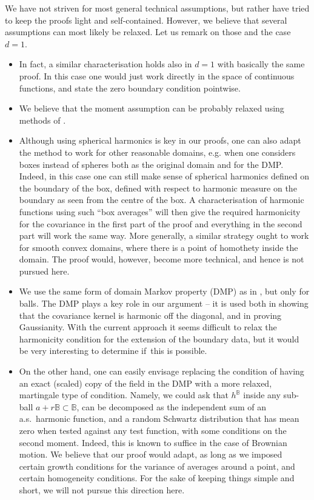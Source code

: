 \documentclass[JEP,XML,SOM,Unicode,published]{cedram}
\theoremstyle{definition}
\newcommand{\B}{\mathbb{B}}\let\D\B\let\Ub\B
\begin{document}
We have not striven for most general technical assumptions, but rather have tried to keep the proofs light and self-contained. However, we believe that several assumptions can most likely be relaxed. Let us remark on those and the case $d = 1$.\vspace*{-.3\baselineskip}\enlargethispage{\baselineskip}%

\begin{itemize}
\item In fact, a similar characterisation holds also in $d = 1$ with basically the same proof. In this case one would just work directly in the space of continuous functions, and state the zero boundary condition pointwise.
\item We believe that the moment assumption can be probably relaxed using methods of \cite{BPR20}.
\item Although using spherical harmonics is key in our proofs, one can also adapt the method to work for other reasonable domains, e.g. when one considers boxes instead of spheres both as the original domain and for the DMP. Indeed, in this case one can still make sense of spherical harmonics defined on the boundary of the box, defined with respect to harmonic measure on the boundary as seen from the centre of the box. A characterisation of harmonic functions using such ``box averages'' will then give the required harmonicity for the covariance in the first part of the proof and everything in the second part will work the same way. More generally, a similar strategy ought to work for smooth convex domains, where there is a point of homothety inside the domain. The proof would, however, become more technical, and hence is not pursued here.
\item We use the same form of domain Markov property (DMP) as in \cite{BPR18}, but only for balls. The DMP plays a key role in our argument -- it is used both in showing that the covariance kernel is harmonic off the diagonal, and in proving Gaussianity. With the current approach it seems difficult to relax the harmonicity condition for the extension of the boundary data, but it would be very interesting to determine if~this is possible.
\item On the other hand, one can easily envisage replacing the condition of having an exact (scaled) copy of the field in the DMP with a more relaxed, martingale type of condition. Namely, we could ask that $h^{\B}$ inside any sub-ball $a+r\B\subset \B$, can be decomposed as the independent sum of an a.s.\ harmonic function, and a random Schwartz distribution that has mean zero when tested against any test function, with some conditions on the second moment. Indeed, this is known to suffice in the case of Brownian motion. We believe that our proof would adapt, as long as we imposed certain growth conditions for the variance of averages around a point, and certain homogeneity conditions. For the sake of keeping things simple and short, we will not pursue this direction here.

\end{itemize}
\end{document}
